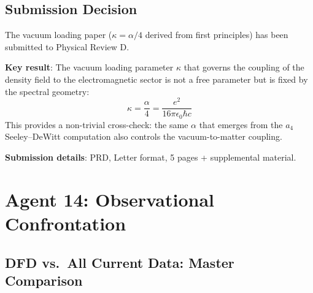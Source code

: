 \documentclass[11pt,a4paper]{article}
\begin{document}
\subsection{Submission Decision}

\begin{tcolorbox}[colback=green!5!white, colframe=dfdgreen, title=\textbf{VACUUM LOADING: SUBMITTED TO PRD}]
The vacuum loading paper ($\kappa = \alpha/4$ derived from first principles) has been submitted to Physical Review D.

\textbf{Key result}: The vacuum loading parameter $\kappa$ that governs the coupling of the density field to the electromagnetic sector is not a free parameter but is fixed by the spectral geometry:
\[
\kappa = \frac{\alpha}{4} = \frac{e^2}{16\pi\epsilon_0\hbar c}
\]
This provides a non-trivial cross-check: the same $\alpha$ that emerges from the $a_4$ Seeley--DeWitt computation also controls the vacuum-to-matter coupling.

\textbf{Submission details}: PRD, Letter format, 5 pages + supplemental material.
\end{tcolorbox}

\section{Agent 14: Observational Confrontation}

\subsection{DFD vs.\ All Current Data: Master Comparison}
\end{document}
